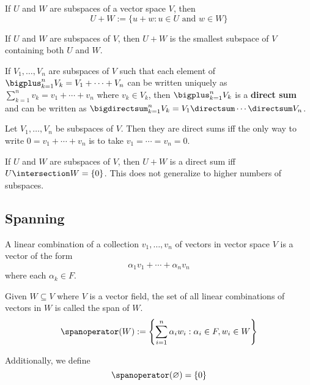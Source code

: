 \begin{definition}
  If $U$ and $W$ are subspaces of a vector space $V$, then
  \[
    U + W := \{ u + w : u \in U \text{ and } w \in W \}
  \]
\end{definition}

\begin{theorem}
  If $U$ and $W$ are subspaces of $V$, then $U + W$ is the smallest subspace of $V$ containing both $U$ and $W$.
\end{theorem}

\begin{definition}
  If $V_1, \ldots, V_n$ are subspaces of $V$ such that each element of $\bigplus_{k = 1}^n V_k = V_1 + \cdots + V_n$ can be written uniquely as $\sum_{k = 1}^n v_k = v_1 + \cdots + v_n$ where $v_k \in V_k$, then $\bigplus_{k = 1}^n V_k$ is a \textbf{direct sum} and can be written as $\bigdirectsum_{k = 1}^n V_k = V_1 \directsum \cdots \directsum V_n$.
\end{definition}

\begin{theorem}
  Let $V_1, \ldots, V_n$ be subspaces of $V$. Then they are direct sums iff the only way to write $0 = v_1 + \cdots + v_n$ is to take $v_1 = \cdots = v_n = 0$.
\end{theorem}

\begin{theorem}
  If $U$ and $W$ are subspaces of $V$, then $U + W$ is a direct sum iff $U \intersection W = \{ 0 \}$. This does not generalize to higher numbers of subspaces.
\end{theorem}

\subsection{Spanning}

\begin{definition}
  A linear combination of a collection $v_1, \ldots, v_n$ of vectors in vector space $V$ is a vector of the form
  \[
    \alpha_1 v_1 + \cdots + \alpha_n v_n
  \]
  where each $\alpha_k \in F$.
\end{definition}

\begin{definition}[Span]
  Given $W \subseteq V$ where $V$ is a vector field, the set of all linear combinations of vectors in $W$ is called the span of $W$.
  \[
    \spanoperator(W) := \left\{ \sum_{i = 1}^n \alpha_i w_i : \alpha_i \in F, w_i \in W \right\}
  \]

  Additionally, we define
  \[
    \spanoperator(\varnothing) = \{ 0 \}
  \]
\end{definition}

